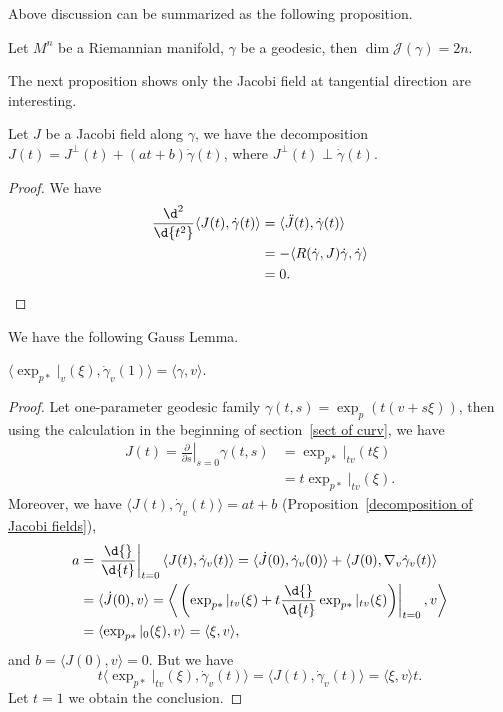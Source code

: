 Above discussion can be summarized as the following proposition.

\begin{prop}
    Let $M^n$ be a Riemannian manifold, $\gamma$ be a geodesic, then $\dim\mathscr{J}(\gamma)=2n$.
\end{prop}

The next proposition shows only the Jacobi field at tangential direction are interesting.
\begin{prop}\label{decomposition of Jacobi fields}
    Let $J$ be a Jacobi field along $\gamma$, we have the decomposition $J(t)=J^\perp(t)+(at+b)\dot{\gamma}(t)$, where $J^\perp(t)\perp\dot{\gamma}(t)$. 
\end{prop}
\begin{proof}
    We have
    \begin{align*}
        \frac{\d^2{}}{\d{t^2}}\langle J(t),\dot{\gamma}(t)\rangle&=\langle\ddot{J}(t),\dot{\gamma}(t)\rangle\\
        &=-\langle R(\dot{\gamma},J)\dot{\gamma},\dot{\gamma}\rangle\\
        &=0.\qedhere
    \end{align*}
\end{proof}

We have the following Gauss Lemma.
\begin{prop}
    $\langle\exp_{p*}|_v(\xi),\dot{\gamma}_v(1)\rangle=\langle\gamma,v\rangle$.
\end{prop}
\begin{proof}
    Let one-parameter geodesic family $\gamma(t,s)=\exp_p(t(v+s\xi))$, then using the calculation in the beginning of section~\ref{sect of curv}, we have
    \begin{align*}
        J(t)=\left.\frac{\partial{}}{\partial{s}}\right|_{s=0}\gamma(t,s)&=\exp_{p*}|_{tv}(t\xi)\\
        &=t\exp_{p*}|_{tv}(\xi).
    \end{align*}
    Moreover, we have $\langle J(t),\dot{\gamma}_v(t)\rangle=at+b$ (Proposition~\ref{decomposition of Jacobi fields}),
    \begin{align*}
        a&=\left.\frac{\d{}}{\d{t}}\right|_{t=0}\langle J(t),\dot{\gamma}_v(t)\rangle=\langle\dot{J}(0),\dot{\gamma}_v(0)\rangle+\langle J(0),\nabla_v\dot{\gamma}_v(t)\rangle\\
        &=\langle\dot{J}(0),v\rangle=\left\langle\left.\left(\exp_{p*}|_{tv}(\xi)+t\frac{\d{}}{\d{t}}\exp_{p*}|_{tv}(\xi)\right)\right|_{t=0},v\right\rangle\\
        &=\langle\exp_{p*}|_0(\xi),v\rangle=\langle\xi,v\rangle,
    \end{align*}
    and $b=\langle J(0),v\rangle=0$.
    But we have
    \[t\langle\exp_{p*}|_{tv}(\xi),\dot{\gamma}_v(t)\rangle=\langle J(t),\dot{\gamma}_v(t)\rangle=\langle\xi,v\rangle t.\]
    Let $t=1$ we obtain the conclusion.
\end{proof}

